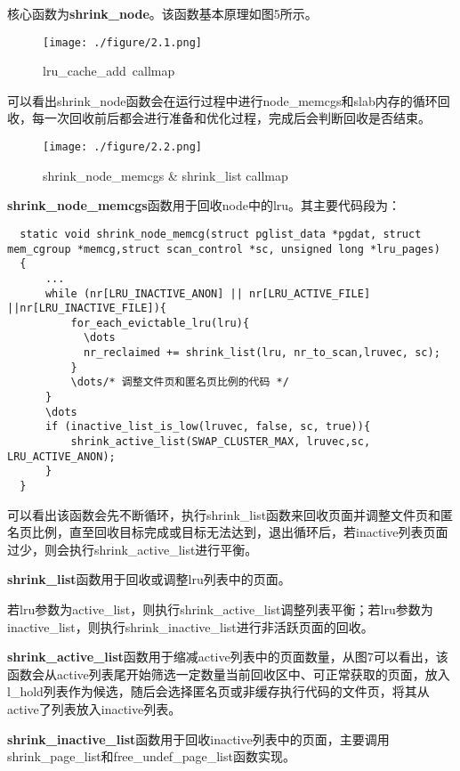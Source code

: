 \documentclass[11pt, a4paper, oneside,UTF8]{ctexart}
\begin{document}
核心函数为\textbf{shrink\_node}。该函数基本原理如图5所示。
\begin{figure}[h]
  \centering
  \texttt{[image: ./figure/2.1.png]}
  \caption{lru\_cache\_add\ callmap}
  \label{figure:2.1}
\end{figure}

可以看出shrink\_node函数会在运行过程中进行node\_memcgs和slab内存的循环回收，每一次回收前后都会进行准备和优化过程，完成后会判断回收是否结束。

\begin{figure}[h]
  \centering
  \texttt{[image: ./figure/2.2.png]}
  \caption{shrink\_node\_memcgs \& shrink\_list callmap}
  \label{figure:2.2}
\end{figure}
\textbf{shrink\_node\_memcgs}函数用于回收node中的lru。其主要代码段为：
\begin{lstlisting}
  static void shrink_node_memcg(struct pglist_data *pgdat, struct mem_cgroup *memcg,struct scan_control *sc, unsigned long *lru_pages)
  {
      ...
      while (nr[LRU_INACTIVE_ANON] || nr[LRU_ACTIVE_FILE] ||nr[LRU_INACTIVE_FILE]){
          for_each_evictable_lru(lru){
            \dots
            nr_reclaimed += shrink_list(lru, nr_to_scan,lruvec, sc);
          }
          \dots/* 调整文件页和匿名页比例的代码 */
      }
      \dots
      if (inactive_list_is_low(lruvec, false, sc, true)){
          shrink_active_list(SWAP_CLUSTER_MAX, lruvec,sc, LRU_ACTIVE_ANON);
      }
  }
\end{lstlisting}
可以看出该函数会先不断循环，执行shrink\_list函数来回收页面并调整文件页和匿名页比例，直至回收目标完成或目标无法达到，退出循环后，若inactive列表页面过少\footnotemark，则会执行shrink\_active\_list进行平衡。

\textbf{shrink\_list}函数用于回收或调整lru列表中的页面。

若lru参数为active\_list，则执行shrink\_active\_list调整列表平衡；若lru参数为inactive\_list，则执行shrink\_inactive\_list进行非活跃页面的回收。


\textbf{shrink\_active\_list}函数用于缩减active列表中的页面数量，从图7可以看出，该函数会从active列表尾开始筛选一定数量当前回收区中、可正常获取的页面，放入l\_hold列表作为候选，随后会选择匿名页或非缓存执行代码的文件页，将其从active了列表放入inactive列表。

\textbf{shrink\_inactive\_list}函数用于回收inactive列表中的页面，主要调用shrink\_page\_list和free\_undef\_page\_list函数实现。
\end{document}
